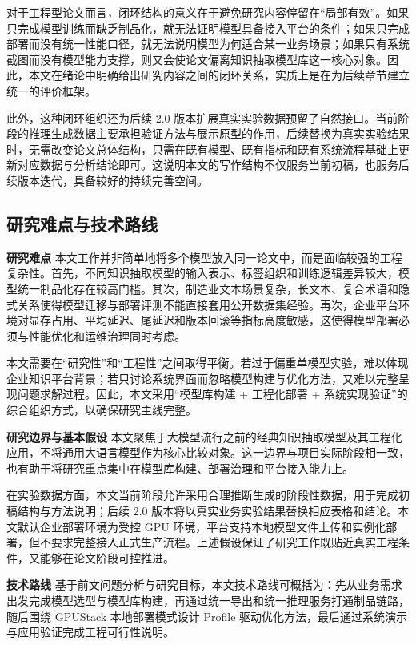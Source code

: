 对于工程型论文而言，闭环结构的意义在于避免研究内容停留在“局部有效”。如果只完成模型训练而缺乏制品化，就无法证明模型具备接入平台的条件；如果只完成部署而没有统一性能口径，就无法说明模型为何适合某一业务场景；如果只有系统截图而没有模型能力支撑，则又会使论文偏离知识抽取模型库这一核心对象。因此，本文在绪论中明确给出研究内容之间的闭环关系，实质上是在为后续章节建立统一的评价框架。

此外，这种闭环组织还为后续 2.0 版本扩展真实实验数据预留了自然接口。当前阶段的推理生成数据主要承担验证方法与展示原型的作用，后续替换为真实实验结果时，无需改变论文总体结构，只需在既有模型、既有指标和既有系统流程基础上更新对应数据与分析结论即可。这说明本文的写作结构不仅服务当前初稿，也服务后续版本迭代，具备较好的持续完善空间。

\subsection{研究难点与技术路线}
\par\textbf{研究难点}
本文工作并非简单地将多个模型放入同一论文中，而是面临较强的工程复杂性。首先，不同知识抽取模型的输入表示、标签组织和训练逻辑差异较大，模型统一制品化存在较高门槛。其次，制造业文本场景复杂，长文本、复合术语和隐式关系使得模型迁移与部署评测不能直接套用公开数据集经验。再次，企业平台环境对显存占用、平均延迟、尾延迟和版本回滚等指标高度敏感，这使得模型部署必须与性能优化和运维治理同时考虑。

本文需要在“研究性”和“工程性”之间取得平衡。若过于偏重单模型实验，难以体现企业知识平台背景；若只讨论系统界面而忽略模型构建与优化方法，又难以完整呈现问题求解过程。因此，本文采用“模型库构建 + 工程化部署 + 系统实现验证”的综合组织方式，以确保研究主线完整。

\par\textbf{研究边界与基本假设}
本文聚焦于大模型流行之前的经典知识抽取模型及其工程化应用，不将通用大语言模型作为核心比较对象。这一边界与项目实际阶段相一致，也有助于将研究重点集中在模型库构建、部署治理和平台接入能力上。

在实验数据方面，本文当前阶段允许采用合理推断生成的阶段性数据，用于完成初稿结构与方法说明；后续 2.0 版本将以真实业务实验结果替换相应表格和结论。本文默认企业部署环境为受控 GPU 环境，平台支持本地模型文件上传和实例化部署，但不要求完整接入正式生产流程。上述假设保证了研究工作既贴近真实工程条件，又能够在论文阶段可控推进。

\par\textbf{技术路线}
基于前文问题分析与研究目标，本文技术路线可概括为：先从业务需求出发完成模型选型与模型库构建，再通过统一导出和统一推理服务打通制品链路，随后围绕 GPUStack 本地部署模式设计 Profile 驱动优化方法，最后通过系统演示与应用验证完成工程可行性说明。

